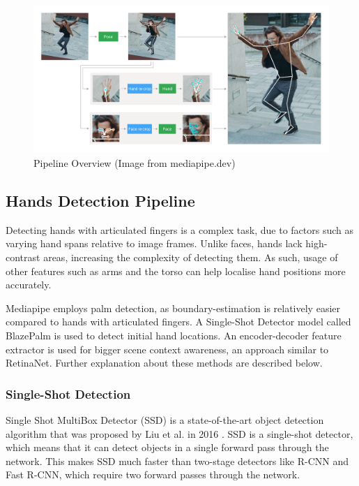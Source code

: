 \documentclass[final,rdr32.tex]{subfiles}
\begin{document}
\begin{figure}[H]
    \begin{center}
        \includegraphics[width=\textwidth]{images/holistic_pipeline.png}
        \caption[caption]{Pipeline Overview (Image from mediapipe.dev)}
    \end{center}
\end{figure}


\subsection{Hands Detection Pipeline}

Detecting hands with articulated fingers is a complex task, due to factors such as varying hand spans relative to image frames. Unlike faces, hands lack high-contrast areas, increasing the complexity of detecting them. As such, usage of other features such as arms and the torso can help localise hand positions more accurately.

Mediapipe employs palm detection, as boundary-estimation is relatively easier compared to hands with articulated fingers. A Single-Shot Detector model called BlazePalm is used to detect initial hand locations. An encoder-decoder feature extractor is used for bigger scene context awareness, an approach similar to RetinaNet. Further explanation about these methods are described below.

\subsubsection{Single-Shot Detection}

Single Shot MultiBox Detector (SSD) is a state-of-the-art object detection algorithm that was proposed by Liu et al. in 2016 \cite{liu2016ssd}. SSD is a single-shot detector, which means that it can detect objects in a single forward pass through the network. This makes SSD much faster than two-stage detectors like R-CNN and Fast R-CNN, which require two forward passes through the network.
\end{document}

